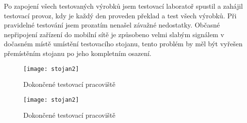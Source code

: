 Po zapojení všech testovaných výrobků jsem testovací laboratoř spustil a zahájil testovací provoz, kdy je každý den proveden překlad a test všech výrobků. Při pravidelné testování jsem prozatím nenašel závažné nedostatky. Občasné nepřipojení zařízení do mobilní sítě je způsobeno velmi slabým signálem v dočasném místě umístění testovacího stojanu, tento problém by měl být vyřešen přemístěním stojanu po jeho kompletním osazení.

\begin{figure}[h]
  \centering
  \texttt{[image: stojan2]}
  \caption{Dokončené testovací pracoviště}
  \label{fig:stojan2}
\end{figure}

\begin{figure}[h]
  \centering
  \texttt{[image: stojan2]}
  \caption{Dokončené testovací pracoviště}
  \label{fig:stojan2}
\end{figure}



\endinput

